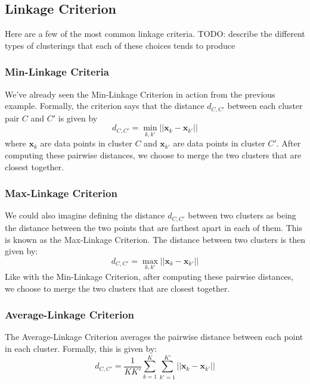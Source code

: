 \subsection{Linkage Criterion}
Here are a few of the most common linkage criteria. TODO: describe the different types of clusterings that each of these choices tends to produce

\subsubsection{Min-Linkage Criteria}
We've already seen the Min-Linkage Criterion in action from the previous example. Formally, the criterion says that the distance $d_{C, C'}$ between each cluster pair $C$ and $C'$ is given by
\begin{equation} \label{min-linkage-crit}
	d_{C, C'} = \underset{k, k'}{\min} || \textbf{x}_{k} - \textbf{x}_{k'} ||
\end{equation}
where $\textbf{x}_{k}$ are data points in cluster $C$ and $\textbf{x}_{k'}$ are data points in cluster $C'$. After computing these pairwise distances, we choose to merge the two clusters that are closest together.

\subsubsection{Max-Linkage Criterion}
We could also imagine defining the distance $d_{C, C'}$ between two clusters as being the distance between the two points that are farthest apart in each of them. This is known as the Max-Linkage Criterion. The distance between two clusters is then given by:
\begin{equation} \label{max-linkage-crit}
	d_{C, C'} = \underset{k, k'}{\max} || \textbf{x}_{k} - \textbf{x}_{k'} ||
\end{equation}
Like with the Min-Linkage Criterion, after computing these pairwise distances, we choose to merge the two clusters that are closest together.


\subsubsection{Average-Linkage Criterion}
The Average-Linkage Criterion averages the pairwise distance between each point in each cluster. Formally, this is given by:
\begin{equation} \label{avg-linkage-crit}
	d_{C, C'} = \frac{1}{K K'} \sum_{k=1}^{K} \sum_{k'=1}^{K'} || \textbf{x}_{k} - \textbf{x}_{k'} ||
\end{equation}

